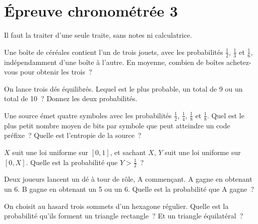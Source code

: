 \chapter{Épreuve chronométrée 3}\label{ch:iv1:timed-test-3}

\begin{ivtrains}
Il faut la traiter d'une seule traite, sans notes ni calculatrice.
\end{ivtrains}


\begin{question}\label{iq:iv1:timed-test-3:1}
Une boîte de céréales contient l'un de trois jouets, avec les probabilités $\frac12$, $\frac13$ et $\frac16$, indépendamment d'une boîte à l'autre. En moyenne, combien de boîtes achetez-vous pour obtenir les trois~?
\end{question}

\begin{question}\label{iq:iv1:timed-test-3:2}
On lance trois dés équilibrés. Lequel est le plus probable, un total de 9 ou un total de 10~? Donnez les deux probabilités.
\end{question}

\begin{question}\label{iq:iv1:timed-test-3:3}
Une source émet quatre symboles avec les probabilités $\frac12$, $\frac14$, $\frac18$ et $\frac18$. Quel est le plus petit nombre moyen de bits par symbole que peut atteindre un code préfixe~? Quelle est l'entropie de la source~?
\end{question}

\begin{question}\label{iq:iv1:timed-test-3:4}
$X$ suit une loi uniforme sur $[0, 1]$, et sachant $X$, $Y$ suit une loi uniforme sur $[0, X]$. Quelle est la probabilité que $Y > \frac12$~?
\end{question}

\begin{question}\label{iq:iv1:timed-test-3:5}
Deux joueurs lancent un dé à tour de rôle, A commençant. A gagne en obtenant un 6. B gagne en obtenant un 5 ou un 6. Quelle est la probabilité que A gagne~?
\end{question}

\begin{question}\label{iq:iv1:timed-test-3:6}
On choisit au hasard trois sommets d'un hexagone régulier. Quelle est la probabilité qu'ils forment un triangle rectangle~? Et un triangle équilatéral~?
\end{question}

